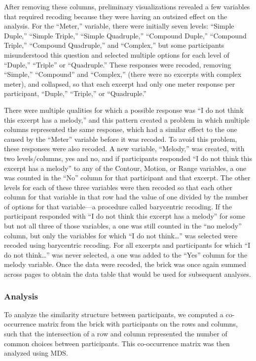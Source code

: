 \documentclass[
  english,
  man]{apa6}
\begin{document}
After removing these columns, preliminary visualizations revealed a few variables that required recoding because they were having an outsized effect on the analysis. For the ``Meter,'' variable, there were initially seven levels: ``Simple Duple,'' ``Simple Triple,'' ``Simple Quadruple,'' ``Compound Duple,'' ``Compound Triple,'' ``Compound Quadruple,'' and ``Complex,'' but some participants misunderstood this question and selected multiple options for each level of ``Duple,'' ``Triple'' or ``Quadruple.'' These responses were recoded, removing ``Simple,'' ``Compound'' and ``Complex,'' (there were no excerpts with complex meter), and collapsed, so that each excerpt had only one meter response per participant, ``Duple,'' ``Triple,'' or ``Quadruple.''

There were multiple qualities for which a possible response was ``I do not think this excerpt has a melody,'' and this pattern created a problem in which multiple columns represented the same response, which had a similar effect to the one caused by the ``Meter'' variable before it was recoded. To avoid this problem, these responses were also recoded. A new variable, ``Melody,'' was created, with two levels/columns, yes and no, and if participants responded ``I do not think this excerpt has a melody'' to any of the Contour, Motion, or Range variables, a one was counted in the ``No'' column for that participant and that excerpt. The other levels for each of these three variables were then recoded so that each other column for that variable in that row had the value of one divided by the number of options for that variable---a procedure called barycentric recoding. If the participant responded with ``I do not think this excerpt has a melody'' for some but not all three of those variables, a one was still counted in the ``no melody'' column, but only the variables for which ``I do not think\ldots{}'' was selected were recoded using barycentric recoding. For all excerpts and participants for which ``I do not think\ldots{}'' was never selected, a one was added to the ``Yes'' column for the melody variable. Once the data were recoded, the brick was once again summed across pages to obtain the data table that would be used for subsequent analyses.

\hypertarget{analysis}{%
\subsubsection{Analysis}\label{analysis}}

To analyze the similarity structure between participants, we computed a co-occurrence matrix from the brick with participants on the rows and columns, such that the intersection of a row and column represented the number of common choices between participants. This co-occurrence matrix was then analyzed using MDS.
\end{document}

